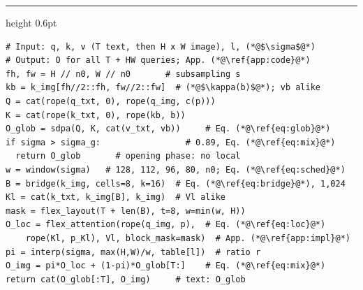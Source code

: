  \begin{minipage}[t]{0.48\linewidth}
    \hrule height 0.6pt\vspace{2pt}
    \label{alg:sample}
    \vspace{-4pt}
\begin{lstlisting}[style=scacode, emph={rope,sdpa,cat,window,bridge,flex_layout,flex_attention,interp}]
# Input: q, k, v (T text, then H x W image), l, (*@$\sigma$@*)
# Output: O for all T + HW queries; App. (*@\ref{app:code}@*)
fh, fw = H // n0, W // n0       # subsampling s
kb = k_img[fh//2::fh, fw//2::fw]  # (*@$\kappa(b)$@*); vb alike
Q = cat(rope(q_txt, 0), rope(q_img, c(p)))
K = cat(rope(k_txt, 0), rope(kb, b))
O_glob = sdpa(Q, K, cat(v_txt, vb))     # Eq. (*@\ref{eq:glob}@*)
if sigma > sigma_g:                 # 0.89, Eq. (*@\ref{eq:mix}@*)
  return O_glob       # opening phase: no local
w = window(sigma)   # 128, 112, 96, 80, n0; Eq. (*@\ref{eq:sched}@*)
B = bridge(k_img, cells=8, k=16)  # Eq. (*@\ref{eq:bridge}@*), 1,024
Kl = cat(k_txt, k_img[B], k_img)  # Vl alike
mask = flex_layout(T + len(B), t=8, w=min(w, H))
O_loc = flex_attention(rope(q_img, p),  # Eq. (*@\ref{eq:loc}@*)
    rope(Kl, p_Kl), Vl, block_mask=mask)  # App. (*@\ref{app:impl}@*)
pi = interp(sigma, max(H,W)/w, table[l])  # ratio r
O_img = pi*O_loc + (1-pi)*O_glob[T:]    # Eq. (*@\ref{eq:mix}@*)
return cat(O_glob[:T], O_img)     # text: O_glob
\end{lstlisting}
  \end{minipage}
